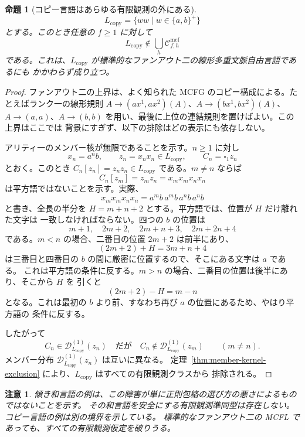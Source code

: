 \documentclass[11pt,a4paper]{ltjsarticle}
\newtheorem{proposition}[theorem]{命題}
\newtheorem{remark}[theorem]{注意}
\theoremstyle{remark}
\newcommand{\Cmcf}[2]{\mathcal{C}^{\mathrm{mcf}}_{#1,#2}}
\newcommand{\D}{\mathcal{D}}
\newcommand{\blank}{\square}
\begin{document}
\begin{proposition}[コピー言語はあらゆる有限観測の外にある]
\label{prop:copy-language-outside-every-finite-observation}
\[
  L_{\mathrm{copy}}=
  \{ww\mid w\in\{a,b\}^+\}
\]
とする。このとき任意の \(f\ge1\) に対して
\[
  L_{\mathrm{copy}}\notin\bigcup_h \Cmcf{f}{h}
\]
である。これは、\(L_{\mathrm{copy}}\) が標準的なファンアウト二の線形多重文脈自由言語であるにも
かかわらず成り立つ。
\end{proposition}

\begin{proof}
ファンアウト二の上界は、よく知られた MCFG のコピー構成による。たとえばランク一の線形規則
\(A\to(a x^1,a x^2)(A)\)、\(A\to(b x^1,b x^2)(A)\)、
\(A\to(a,a)\)、\(A\to(b,b)\) を用い、最後に上位の連結規則を置けばよい。この上界はここでは
背景にすぎず、以下の排除はどの表示にも依存しない。

アリティ一のメンバー核が無限であることを示す。\(n\ge1\) に対し
\[
  x_n=a^n b,
  \qquad
  z_n=x_nx_n\in L_{\mathrm{copy}},
  \qquad
  C_n=\blank_1 z_n
\]
とおく。このとき \(C_n[z_n]=z_nz_n\in L_{\mathrm{copy}}\) である。\(m\ne n\) ならば
\[
  C_n[z_m]=z_mz_n=x_mx_mx_nx_n
\]
は平方語ではないことを示す。実際、
\[
  x_mx_mx_nx_n=a^m b\,a^m b\,a^n b\,a^n b
\]
と書き、全長の半分を \(H=m+n+2\) とする。平方語では、位置が \(H\) だけ離れた文字は
一致しなければならない。四つの \(b\) の位置は
\[
  m+1,
  \quad 2m+2,
  \quad 2m+n+3,
  \quad 2m+2n+4
\]
である。\(m<n\) の場合、二番目の位置 \(2m+2\) は前半にあり、
\[
  (2m+2)+H=3m+n+4
\]
は三番目と四番目の \(b\) の間に厳密に位置するので、そこにある文字は \(a\) である。
これは平方語の条件に反する。\(m>n\) の場合、二番目の位置は後半にあり、そこから \(H\) を
引くと
\[
  (2m+2)-H=m-n
\]
となる。これは最初の \(b\) より前、すなわち再び \(a\) の位置にあるため、やはり平方語の
条件に反する。

したがって
\[
  C_n\in\D_{L_{\mathrm{copy}}}^{(1)}(z_n)
  \quad\text{だが}\quad
  C_n\notin\D_{L_{\mathrm{copy}}}^{(1)}(z_m)
  \qquad(m\ne n).
\]
メンバー分布 \(\D_{L_{\mathrm{copy}}}^{(1)}(z_n)\) は互いに異なる。
定理~\ref{thm:member-kernel-exclusion} により、\(L_{\mathrm{copy}}\) はすべての有限観測クラスから
排除される。
\end{proof}

\begin{remark}
傾き和言語の例は、この障害が単に正則包絡の選び方の悪さによるものではないことを示す。
その和言語を安全にする有限観測準同型は存在しない。コピー言語の例は別の境界を示している。
標準的なファンアウト二の MCFL であっても、すべての有限観測仮定を破りうる。
\end{remark}
\end{document}
